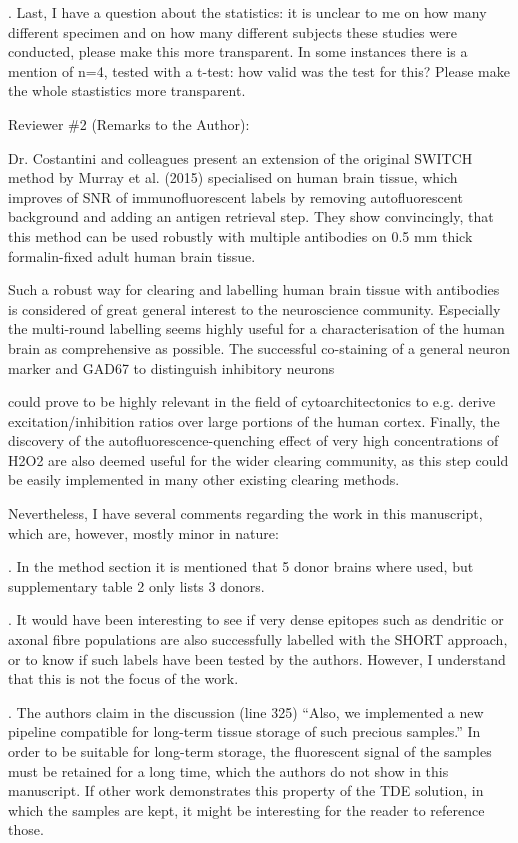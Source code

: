 \documentclass{article}
\begin{document}
. Last, I have a question about the statistics: it is unclear to me on how many different specimen and on how many different subjects these studies were conducted, please make this more transparent. In some instances there is a mention of n=4, tested with a t-test: how valid was the test for this? Please make the whole stastistics more transparent.

\noindent Reviewer \#2 (Remarks to the Author):

\noindent Dr. Costantini and colleagues present an extension of the original SWITCH method by Murray et al. (2015) specialised on human brain tissue, which improves of SNR of immunofluorescent labels by removing autofluorescent background and adding an antigen retrieval step. They show convincingly, that this method can be used robustly with multiple antibodies on 0.5 mm thick formalin-fixed adult human brain tissue.

\noindent Such a robust way for clearing and labelling human brain tissue with antibodies is considered of great general interest to the neuroscience community. Especially the multi-round labelling seems highly useful for a characterisation of the human brain as comprehensive as possible. The successful co-staining of a general neuron marker and GAD67 to distinguish inhibitory neurons

\noindent {}could prove to be highly relevant in the field of cytoarchitectonics to e.g. derive excitation/inhibition ratios over large portions of the human cortex. Finally, the discovery of the autofluorescence-quenching effect of very high concentrations of H2O2 are also deemed useful for the wider clearing community, as this step could be easily implemented in many other existing clearing methods.

\noindent Nevertheless, I have several comments regarding the work in this manuscript, which are, however, mostly minor in nature:

. In the method section it is mentioned that 5 donor brains where used, but supplementary table 2 only lists 3 donors.

. It would have been interesting to see if very dense epitopes such as dendritic or axonal fibre populations are also successfully labelled with the SHORT approach, or to know if such labels have been tested by the authors. However, I understand that this is not the focus of the work.

. The authors claim in the discussion (line 325) “Also, we implemented a new pipeline compatible for long-term tissue storage of such precious samples.” In order to be suitable for long-term storage, the fluorescent signal of the samples must be retained for a long time, which the authors do not show in this manuscript. If other work demonstrates this property of the TDE solution, in which the samples are kept, it might be interesting for the reader to reference those.
\end{document}
